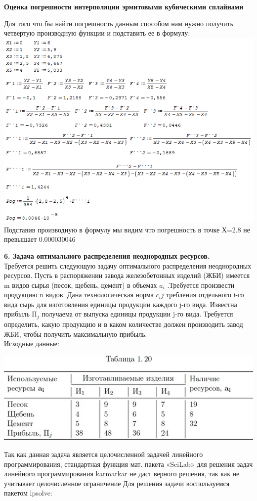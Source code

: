 \documentclass[russian,utf8,nocolumnxxxi,nocolumnxxxii]{eskdtext}
\begin{document}
\newpage
\begin{center}

{\bf Оценка погрешности интерполяции эрмитовыми
кубическими сплайнами}

\end{center}
Для того что бы найти погрешность данным способом нам нужно получить четвертую производную функции и подставить ее в формулу:
\\\includegraphics[scale=1]{2}
\\Подставив производную в формулу мы видим что погрешность в точке Х=2.8 не превышает 0.000030046
\newpage 
\par 
\normalsize 
{\bf6. Задача оптимального распределения неоднородных ресурсов.}\\ 
Требуется решить следующую задачу оптимального распределения неоднородных ресурсов. Пусть в распоряжении завода железобетонных изделий (ЖБИ) имеется m видов сырья (песок, щебень, цемент) в объемах $ a_i$ .Требуется произвести продукцию n видов. Дана технологическая норма $c_ij$ требления отдельного i-го вида сырь для изготовления единицы продукции каждого j-го вида. Известна прибыль $П_j$ получаема от выпуска единицы продукции j-го вида. Требуется определить, какую продукцию и в каком количестве должен производить завод ЖБИ, чтобы получить максимальную прибыль.\\ 
Исходные данные:\\ 

\begin{center} 
\includegraphics[scale=0.7]{1} 
\end{center} 
Так как данная задача является целочисленной задачей линейного программирования, стандартная функция мат. пакета «SciLab» для решения задач линейного программирования karmarkar не даст верного решения, так как не учитывает целочисленное ограничение 
Для решения задачи воспользуемся пакетом lpsolve: 
\end{document}
